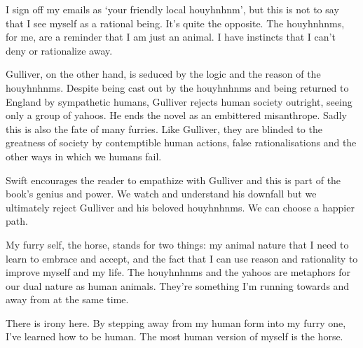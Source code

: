 I sign off my emails as `your friendly local houyhnhnm', but this is not to say that I see myself as a rational being. It's quite the opposite. The houyhnhnms, for me, are a reminder that I am just an animal. I have instincts that I can't deny or rationalize away.

Gulliver, on the other hand, is seduced by the logic and the reason of the houyhnhnms. Despite being cast out by the houyhnhnms and being returned to England by sympathetic humans, Gulliver rejects human society outright, seeing only a group of yahoos. He ends the novel as an embittered misanthrope. Sadly this is also the fate of many furries. Like Gulliver, they are blinded to the greatness of society by contemptible human actions, false rationalisations and the other ways in which we humans fail.

Swift encourages the reader to empathize with Gulliver and this is part of the book's genius and power. We watch and understand his downfall but we ultimately reject Gulliver and his beloved houyhnhnms. We can choose a happier path.

My furry self, the horse, stands for two things: my animal nature that I need to learn to embrace and accept, and the fact that I can use reason and rationality to improve myself and my life. The houyhnhnms and the yahoos are metaphors for our dual nature as human animals. They're something I'm running towards and away from at the same time.

There is irony here. By stepping away from my human form into my furry one, I've learned how to be human. The most human version of myself is the horse.
